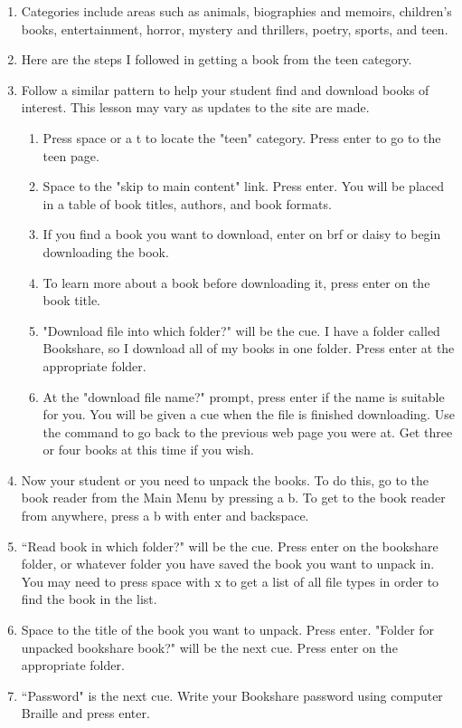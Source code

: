 \documentclass[10pt,letterpaper,twoside]{report}
\begin{document}
{{{\begin{enumerate}
	\item Categories include areas such as animals, biographies and memoirs, children's books, entertainment, horror, mystery and thrillers, poetry, sports, and teen.
	\item Here are the steps I followed in getting a book from the teen category.
	\item Follow a similar pattern to help your student find and download books of interest. This lesson may vary as updates to the site are made.
	      \begin{enumerate}
		      \item Press space or a t to locate the "teen" category.  Press enter to go to the teen page.
		      \item Space to the "skip to main content" link. Press enter. You will be placed in a table of book titles, authors, and book formats.
		      \item If you find a book you want to download, enter on brf or daisy to begin downloading the book.
		      \item To learn more about a book before downloading it, press enter on the book title.
		      \item "Download file into which folder?" will be the cue.  I have a folder called Bookshare, so I download all of my books in one folder.  Press enter at the appropriate folder.
		      \item At the "download file name?" prompt, press enter if the name is suitable for you.  You will be given a cue when the file is finished downloading.  Use the command to go back to the previous web page you were at. Get three or four books at this time if you wish.
	      \end{enumerate}
	\item Now your student or you need to unpack the books.  To do this, go to the book reader from the Main Menu by pressing a b.  To get to the book reader from anywhere, press a b with enter and backspace.
	\item ``Read book in which folder?" will be the cue.  Press enter on the bookshare folder, or whatever folder you have saved the book you want to unpack in. You may need to press space with x to get a list of all file types in order to find the book in the list.
	\item Space to the title of the book you want to unpack.  Press enter. "Folder for unpacked bookshare book?" will be the next cue.  Press enter on the appropriate folder.
	\item ``Password" is the next cue.  Write your Bookshare password using computer Braille and press enter.

\end{enumerate}}}}
\end{document}
